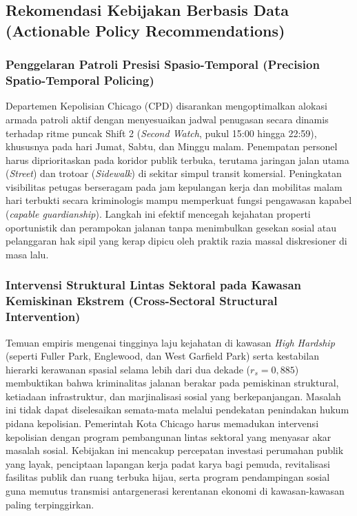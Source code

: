 \documentclass[11pt,a4paper]{article}
\begin{document}
\subsection{Rekomendasi Kebijakan Berbasis Data (Actionable Policy Recommendations)}

\subsubsection{Penggelaran Patroli Presisi Spasio-Temporal (Precision Spatio-Temporal Policing)}
Departemen Kepolisian Chicago (CPD) disarankan mengoptimalkan alokasi armada patroli aktif dengan menyesuaikan jadwal penugasan secara dinamis terhadap ritme puncak Shift 2 (\textit{Second Watch}, pukul 15:00 hingga 22:59), khususnya pada hari Jumat, Sabtu, dan Minggu malam. Penempatan personel harus diprioritaskan pada koridor publik terbuka, terutama jaringan jalan utama (\textit{Street}) dan trotoar (\textit{Sidewalk}) di sekitar simpul transit komersial. Peningkatan visibilitas petugas berseragam pada jam kepulangan kerja dan mobilitas malam hari terbukti secara kriminologis mampu memperkuat fungsi pengawasan kapabel (\textit{capable guardianship}). Langkah ini efektif mencegah kejahatan properti oportunistik dan perampokan jalanan tanpa menimbulkan gesekan sosial atau pelanggaran hak sipil yang kerap dipicu oleh praktik razia massal diskresioner di masa lalu.

\subsubsection{Intervensi Struktural Lintas Sektoral pada Kawasan Kemiskinan Ekstrem (Cross-Sectoral Structural Intervention)}
Temuan empiris mengenai tingginya laju kejahatan di kawasan \textit{High Hardship} (seperti Fuller Park, Englewood, dan West Garfield Park) serta kestabilan hierarki kerawanan spasial selama lebih dari dua dekade ($r_s = 0,885$) membuktikan bahwa kriminalitas jalanan berakar pada pemiskinan struktural, ketiadaan infrastruktur, dan marjinalisasi sosial yang berkepanjangan. Masalah ini tidak dapat diselesaikan semata-mata melalui pendekatan penindakan hukum pidana kepolisian. Pemerintah Kota Chicago harus memadukan intervensi kepolisian dengan program pembangunan lintas sektoral yang menyasar akar masalah sosial. Kebijakan ini mencakup percepatan investasi perumahan publik yang layak, penciptaan lapangan kerja padat karya bagi pemuda, revitalisasi fasilitas publik dan ruang terbuka hijau, serta program pendampingan sosial guna memutus transmisi antargenerasi kerentanan ekonomi di kawasan-kawasan paling terpinggirkan.
\end{document}
